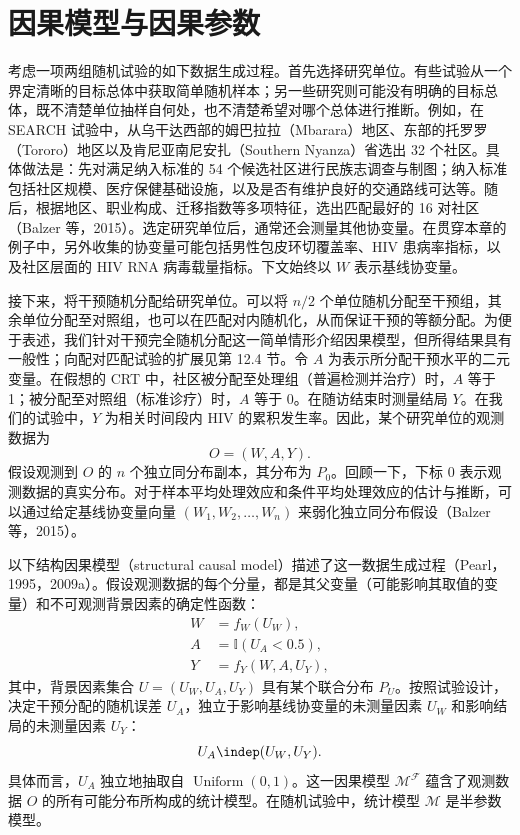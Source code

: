 \section{因果模型与因果参数}

考虑一项两组随机试验的如下数据生成过程。首先选择研究单位。有些试验从一个界定清晰的目标总体中获取简单随机样本；另一些研究则可能没有明确的目标总体，既不清楚单位抽样自何处，也不清楚希望对哪个总体进行推断。例如，在 SEARCH 试验中，从乌干达西部的姆巴拉拉（Mbarara）地区、东部的托罗罗（Tororo）地区以及肯尼亚南尼安扎（Southern Nyanza）省选出 32 个社区。具体做法是：先对满足纳入标准的 54 个候选社区进行民族志调查与制图；纳入标准包括社区规模、医疗保健基础设施，以及是否有维护良好的交通路线可达等。随后，根据地区、职业构成、迁移指数等多项特征，选出匹配最好的 16 对社区（Balzer 等，2015）。选定研究单位后，通常还会测量其他协变量。在贯穿本章的例子中，另外收集的协变量可能包括男性包皮环切覆盖率、HIV 患病率指标，以及社区层面的 HIV RNA 病毒载量指标。下文始终以 $W$ 表示基线协变量。

接下来，将干预随机分配给研究单位。可以将 $n/2$ 个单位随机分配至干预组，其余单位分配至对照组，也可以在匹配对内随机化，从而保证干预的等额分配。为便于表述，我们针对干预完全随机分配这一简单情形介绍因果模型，但所得结果具有一般性；向配对匹配试验的扩展见第 12.4 节。令 $A$ 为表示所分配干预水平的二元变量。在假想的 CRT 中，社区被分配至处理组（普遍检测并治疗）时，$A$ 等于 1；被分配至对照组（标准诊疗）时，$A$ 等于 0。在随访结束时测量结局 $Y$。在我们的试验中，$Y$ 为相关时间段内 HIV 的累积发生率。因此，某个研究单位的观测数据为
\[
O=(W,A,Y).
\]
假设观测到 $O$ 的 $n$ 个独立同分布副本，其分布为 $P_0$。回顾一下，下标 0 表示观测数据的真实分布。对于样本平均处理效应和条件平均处理效应的估计与推断，可以通过给定基线协变量向量 $(W_1,W_2,\ldots,W_n)$ 来弱化独立同分布假设（Balzer 等，2015）。

以下结构因果模型（structural causal model）描述了这一数据生成过程（Pearl，1995，2009a）。假设观测数据的每个分量，都是其父变量（可能影响其取值的变量）和不可观测背景因素的确定性函数：
\begin{equation}
\begin{aligned}
W&=f_W(U_W),\\
A&=\mathbb I(U_A<0.5),\\
Y&=f_Y(W,A,U_Y),
\end{aligned}
\tag{12.1}
\end{equation}
其中，背景因素集合 $U=(U_W,U_A,U_Y)$ 具有某个联合分布 $P_U$。按照试验设计，决定干预分配的随机误差 $U_A$，独立于影响基线协变量的未测量因素 $U_W$ 和影响结局的未测量因素 $U_Y$：
\[
U_A\indep(U_W,U_Y).
\]
具体而言，$U_A$ 独立地抽取自 $\operatorname{Uniform}(0,1)$。这一因果模型 $\mathcal M^{\mathcal F}$ 蕴含了观测数据 $O$ 的所有可能分布所构成的统计模型。在随机试验中，统计模型 $\mathcal M$ 是半参数模型。

